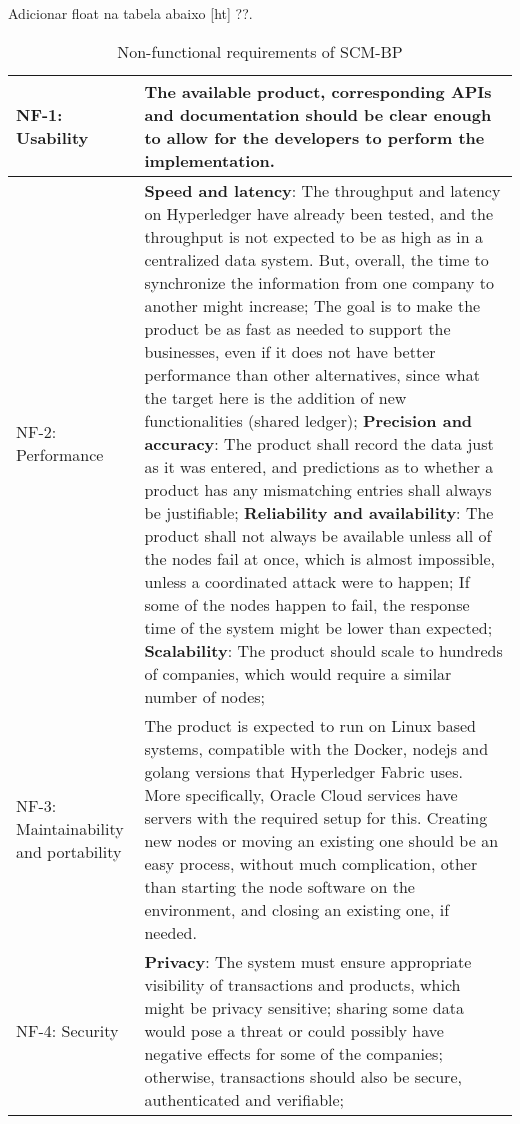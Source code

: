 
{\color{red} Adicionar float na tabela abaixo [ht] ??.}
\begin{table}[htpb]
\caption{Non-functional requirements of \ac{SCM-BP}}
\label{table:rnf}
\begin{tabular}{|p{3cm}|p{12cm}|}
\hline
NF-1: Usability & The available product, corresponding APIs and documentation should be clear enough to allow for the developers to perform the implementation.\\
\hline
NF-2:  \newline Performance &  \textbf{Speed and latency}:  The throughput and latency on Hyperledger have already been tested, and the throughput is not expected to be as high as in a centralized data system. But, overall, the time to synchronize the information from one company to another might increase; The goal is to make the product be as fast as needed to support the businesses, even if it does not have better performance than other alternatives, since what the target here is the addition of new functionalities (shared ledger); \newline
\textbf{Precision and accuracy}: The product shall record the data just as it was entered, and predictions as to whether a product has any mismatching entries shall always be justifiable; \newline
\textbf{Reliability and availability}: The product shall not always be available unless all of the nodes fail at once, which is almost impossible, unless a coordinated attack were to happen; If some of the nodes happen to fail, the response time of the system might be lower than expected; \newline
\textbf{Scalability}: The product should scale to hundreds of companies, which would require a similar number of nodes;
\\
\hline
NF-3:  \newline Maintainability and portability & The product is expected to run on Linux based systems, compatible with the Docker, nodejs and golang versions that Hyperledger Fabric uses. More specifically, Oracle Cloud services have servers with the required setup for this. Creating new nodes or moving an existing one should be an easy process, without much complication, other than starting the node software on the environment, and closing an existing one, if needed. \\
\hline
NF-4: Security & 
\textbf{Privacy}: The system must ensure appropriate visibility of transactions and products, which might be privacy sensitive; sharing some data would pose a threat or could possibly have negative effects for some of the companies; otherwise, transactions should also be secure, authenticated and verifiable; \newline

\end{tabular}
\end{table}
